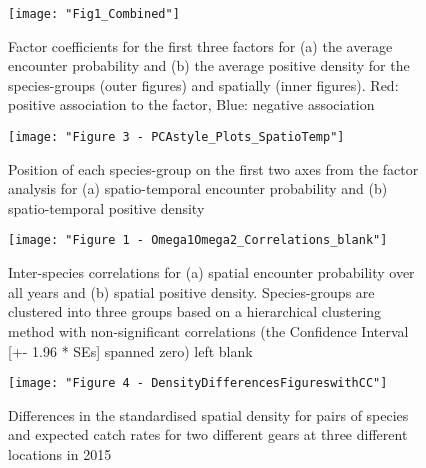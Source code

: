 \documentclass{nature}
\begin{document}


\begin{figure}
\begin{center}
	\texttt{[image: "Fig1\_Combined"]}
	\label{fig:1}
	\caption{Factor coefficients for the first three factors for (a) the
		average encounter probability and (b) the average positive
		density for the species-groups (outer figures) and spatially
		(inner figures).  Red: positive association to the factor,
		Blue: negative association}
\end{center}
\end{figure}


\begin{figure}
\begin{center}
	\texttt{[image: "Figure 3 - PCAstyle\_Plots\_SpatioTemp"]}
	\label{fig:2}
	\caption{Position of each species-group on the first two axes from the
		factor analysis for (a) spatio-temporal encounter probability
		and (b) spatio-temporal positive density}
\end{center}
\end{figure}

\begin{figure}
\begin{center}
	\texttt{[image: "Figure 1 - Omega1Omega2\_Correlations\_blank"]}
	\label{fig:3}
	\caption{Inter-species correlations for (a) spatial encounter
		probability over all years and (b) spatial positive density.
		Species-groups are clustered into three groups based on a
		hierarchical clustering method with non-significant
		correlations (the Confidence Interval [+- 1.96 * SEs] spanned
		zero) left blank}
	\end{center}
\end{figure}

\begin{figure}
\begin{center}
	\texttt{[image: "Figure 4 - DensityDifferencesFigureswithCC"]}
	\label{fig:4}
	\caption{Differences in the standardised spatial density for pairs of
		species and expected catch rates for two different gears at
		three different locations in 2015}
\end{center}
\end{figure}
\end{document}
